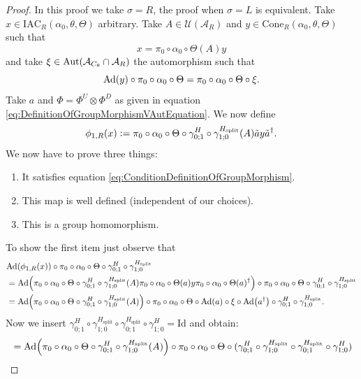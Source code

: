 \documentclass[12pt,a4paper,twoside]{article}
\newcommand{\IAC}{\textrm{IAC}}
\newcommand{\defeq}{\vcentcolon=}
\let\originalleft\left
\let\originalright\right
\renewcommand{\left}{\mathopen{}\mathclose\bgroup\originalleft}
\renewcommand{\right}{\aftergroup\egroup\originalright}
\newcommand{\UU}{\mathcal U}
\renewcommand{\AA}{\mathcal A}
\newcommand{\Ad}[1]{\textrm{Ad}\left(#1\right)}
\newcommand{\Aut}[1]{\textrm{Aut}\left(#1\right)}
\theoremstyle{definition}
\numberwithin{equation}{section}
\begin{document}
\begin{proof}
	In this proof we take $\sigma=R$, the proof when $\sigma=L$ is equivalent. Take $x\in \IAC_R(\alpha_0,\theta,\Theta)$ arbitrary. Take $A\in\UU(\AA_R)$ and $y\in\textrm{Cone}_R(\alpha_0,\theta,\Theta)$ such that
	\begin{equation}
	x=\pi_0\circ\alpha_0\circ\Theta(A)y
	\end{equation}
	and take $\xi\in\Aut{\AA_{C_\theta}\cap \AA_R}$ the automorphism such that
	\begin{equation}
	\Ad{y}\circ\pi_0\circ\alpha_0\circ\Theta=\pi_0\circ\alpha_0\circ\Theta\circ\xi.
	\end{equation}
	Take $a$ and $\Phi=\Phi^U\otimes\Phi^D$ as given in equation \eqref{eq:DefinitionOfGroupMorphismVAutEquation}. We now define
	\begin{equation}
		\phi_{1,R}(x)\defeq \pi_0\circ\alpha_0\circ\Theta\circ\gamma^H_{0;1}\circ\gamma^{H_\text{split}}_{1;0}(A)\tilde{a}y\tilde{a}^\dagger.
	\end{equation}
	We now have to prove three things:
	\begin{enumerate}
		\item It satisfies equation \eqref{eq:ConditionDefinitionOfGroupMorphism}.
		\item This map is well defined (independent of our choices).
		\item This is a group homomorphism.
	\end{enumerate}
	To show the first item just observe that
	\begin{align}
		&\Ad{\phi_{1,R}(x)}\circ\pi_0\circ\alpha_0\circ\Theta\circ\gamma^H_{0;1}\circ\gamma^{H_\text{split}}_{1;0}\\
		&=\Ad{\pi_0\circ\alpha_0\circ\Theta\circ\gamma^H_{0;1}\circ\gamma^{H_\text{split}}_{1;0}(A)\pi_0\circ\alpha_0\circ\Theta(a)y\pi_0\circ\alpha_0\circ\Theta(a)^\dagger}\circ\pi_0\circ\alpha_0\circ\Theta\circ\gamma^H_{0;1}\circ\gamma^{H_\text{split}}_{1;0}\\
		&=\Ad{\pi_0\circ\alpha_0\circ\Theta\circ\gamma^H_{0;1}\circ\gamma^{H_\text{split}}_{1;0}(A)}\circ\pi_0\circ\alpha_0\circ\Theta\circ\Ad{a}\circ\xi\circ\Ad{a^\dagger}\circ\gamma^H_{0;1}\circ\gamma^{H_\text{split}}_{1;0}.
	\end{align}
	Now we insert $\gamma^H_{0;1}\circ\gamma^{H_\text{split}}_{1;0}\circ\gamma^{H_\text{split}}_{0;1}\circ\gamma^H_{1;0}=\text{Id}$ and obtain:
	\begin{align}
		&=\Ad{\pi_0\circ\alpha_0\circ\Theta\circ\gamma^H_{0;1}\circ\gamma^{H_\text{split}}_{1;0}(A)}\circ\pi_0\circ\alpha_0\circ\Theta\circ(\gamma^H_{0;1}\circ\gamma^{H_\text{split}}_{1;0}\circ\gamma^{H_\text{split}}_{0;1}\circ\gamma^H_{1;0})\\

\end{align}
\end{proof}
\end{document}
